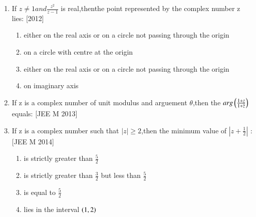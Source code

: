 \documentclass[journal,12pt,twocolumn,article]{IEEEtran}
\theoremstyle{remark}
\begin{document}
\begin{enumerate}[start = 14]
\item If $z \neq 1 and \frac{z^2}{z-1}$ is real,thenthe point represented by the complex number z lies:
\hfill{[2012]}

\begin{enumerate}

\item \text either on the real axis or on a circle not passing through the origin
                                   
                              
\item \text  on a circle with centre at the origin
                             
\item \text either on the real axis or on a circle not passing through the origin                                                               
\item \text on imaginary axis
                                   
\end{enumerate}

\item If z is a complex number of unit modulus and arguement $\theta$,then the $arg\left(\frac{1+z}{1+\overline{z}}\right)$ equals:
\hfill{[JEE M 2013]}

\begin{enumerate}
\end{enumerate}

\item If z is a complex number such that $|z|\geq 2$,then the minimum value of $|z+\frac{1}{2}|$ :     
\hfill{[JEE M 2014]}  

\begin{enumerate}
                             
\item \text is strictly greater than $\frac{5}{2}$      

\item \text is strictly greater than $\frac{3}{2}$ but less than $\frac{5}{2}$ 
\item \text is equal to $\frac{5}{2}$ 

\item \text lies in the interval $\left(1,2\right)$ 


\end{enumerate}
\end{enumerate}
\end{document}
